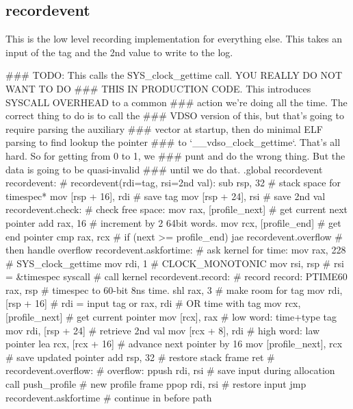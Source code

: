 \subsection{recordevent}

This is the low level recording implementation for everything else. This takes
an input of the tag and the 2nd value to write to the log.

\begin{asm}
### TODO: This calls the SYS_clock_gettime call. YOU REALLY DO NOT WANT TO DO
### THIS IN PRODUCTION CODE. This introduces SYSCALL OVERHEAD to a common
### action we're doing all the time. The correct thing to do is to call the
### VDSO version of this, but that's going to require parsing the auxiliary
### vector at startup, then do minimal ELF parsing to find lookup the pointer
### to `__vdso_clock_gettime`. That's all hard. So for getting from 0 to 1, we
### punt and do the wrong thing. But the data is going to be quasi-invalid
### until we do that.
.global recordevent
recordevent:                                # recordevent(rdi=tag, rsi=2nd val):
	sub	rsp, 32			    #   stack space for timespec*
	mov	[rsp + 16], rdi		    #   save tag
	mov	[rsp + 24], rsi		    #   save 2nd val
recordevent.check:			    # check free space:
	mov	rax, [profile_next]	    #   get current next pointer
	add	rax, 16			    #   increment by 2 64bit words.
	mov	rcx, [profile_end]	    #   get end pointer
	cmp	rax, rcx		    #   if (next >= profile_end)
	jae	recordevent.overflow	    #   then handle overflow
recordevent.askfortime:			    # ask kernel for time:
	mov	rax, 228		    #   SYS_clock_gettime
	mov	rdi, 1			    #   CLOCK_MONOTONIC
	mov	rsi, rsp		    #   rsi = &timespec
	syscall				    #   call kernel
recordevent.record:			    # record record:
	PTIME60	rax, rsp		    #   timespec to 60-bit 8ns time.
	shl	rax, 3			    #   make room for tag
	mov	rdi, [rsp + 16]		    #   rdi = input tag
	or	rax, rdi		    #   OR time with tag
	mov	rcx, [profile_next]	    #   get current pointer
	mov	[rcx], rax		    #   low word: time+type tag
	mov	rdi, [rsp + 24]		    #   retrieve 2nd val
	mov	[rcx + 8], rdi		    #   high word: law pointer
	lea	rcx, [rcx + 16]		    #   advance next pointer by 16
	mov	[profile_next], rcx	    #   save updated pointer
	add	rsp, 32			    #   restore stack frame
	ret                                 #
recordevent.overflow:                       # overflow:
	ppush	rdi, rsi                    #   save input during allocation
	call	push_profile		    #   new profile frame
	ppop	rdi, rsi                    #   restore input
	jmp	recordevent.askfortime	    #   continue in before path
\end{asm}

